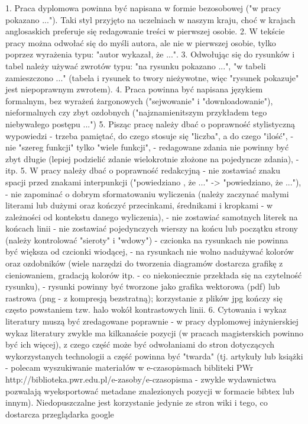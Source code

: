     1. Praca dyplomowa powinna być napisana w  formie bezosobowej ("w pracy pokazano ..."). Taki styl przyjęto na uczelniach w naszym kraju, choć w krajach anglosaskich preferuje się redagowanie treści w pierwszej osobie.
    2. W tekście pracy można odwołać się do myśli autora, ale nie w pierwszej osobie, tylko poprzez wyrażenia typu: "autor wykazał, że ...".
    3. Odwołując się do rysunków i tabel należy używać zwrotów typu: "na rysunku pokazano ...", "w tabeli zamieszczono ..." (tabela i rysunek to twory nieżywotne, więc "rysunek pokazuje" jest niepoprawnym zwrotem).
    4. Praca powinna być napisana językiem formalnym, bez wyrażeń żargonowych ("sejwowanie" i "downloadowanie"), nieformalnych czy zbyt ozdobnych ("najznamienitszym przykładem tego niebywałego postępu ...")
    5. Pisząc pracę należy dbać o poprawność stylistyczną wypowiedzi
        - trzeba pamiętać, do czego stosuje się "liczba", a do czego "ilość",
        - nie "szereg funkcji" tylko "wiele funkcji",
        - redagowane zdania nie powinny być zbyt długie (lepiej podzielić zdanie wielokrotnie złożone na pojedyncze zdania),
        - itp.
    5. W pracy należy dbać o poprawność redakcyjną
        - nie zostawiać znaku spacji przed znakami interpunkcji ("powiedziano , że ..." -> "powiedziano, że ..."),
        - nie zapominać o dobrym sformatowaniu wyliczenia (należy zaczynać małymi literami lub dużymi oraz kończyć przecinkami, średnikami i kropkami - w zależności od kontekstu danego wyliczenia),
        - nie zostawiać samotnych literek na końcach linii
        - nie zostawiać pojedynczych wierszy na końcu lub początku strony (należy kontrolować "sieroty" i "wdowy")
        - czcionka na rysunkach nie powinna być większa od czcionki wiodącej,
        - na rysunkach nie wolno nadużywać kolorów oraz ozdobników (wiele narzędzi do tworzenia diagramów dostarcza grafikę z cieniowaniem, gradacją kolorów itp. - co niekoniecznie przekłada się na czytelność rysunku),
        - rysunki powinny być tworzone jako grafika wektorowa (pdf) lub rastrowa (png - z kompresją bezstratną); korzystanie z plików jpg kończy się często powstaniem tzw. halo wokół kontrastowych linii.
    6. Cytowania i wykaz literatury muszą być zredagowane poprawnie
      - w pracy dyplomowej inżynierskiej wykaz literatury zwykle ma kilkanaście pozycji (w pracach magisterskich powinno być ich więcej), z czego część może być odwołaniami do stron dotyczących wykorzystanych technologii a część powinna być "twarda" (tj. artykuły lub książki - polecam wyszukiwanie materiałów w e-czasopismach bibliteki PWr http://biblioteka.pwr.edu.pl/e-zasoby/e-czasopisma - zwykle wydawnictwa pozwalają wyeksportować metadane znalezionych pozycji w formacie bibtex lub innym). Niedopuszczalne jest korzystanie jedynie ze stron wiki i tego, co dostarcza przeglądarka google
